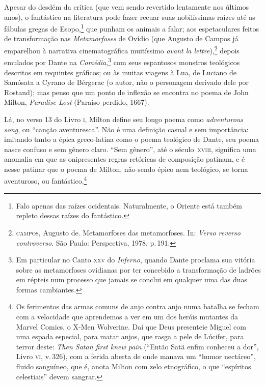 Apesar do desdém da crítica (que vem sendo revertido lentamente nos
últimos anos), o fantástico na literatura pode fazer recuar suas
nobilíssimas raízes até as fábulas gregas de Esopo,\footnote{Falo apenas
  das raízes ocidentais. Naturalmente, o Oriente está também repleto
  dessas raízes do fantástico.} que punham os animais a falar; aos
espetaculares feitos de transformação nas \emph{Metamorfoses} de Ovídio
(que Augusto de Campos já emparelhou à narrativa cinematográfica
muitíssimo \emph{avant la lettre}),\footnote{\textsc{campos}, Augusto de. Metamorfoses das
  metamorfoses. In: \emph{Verso reverso
  controverso}. São Paulo: Perspectiva, 1978, p.\,191.} depois emulados por
Dante na \emph{Comédia},\footnote{Em particular no Canto \textsc{xxv} do \emph{Inferno},
  quando Dante proclama sua vitória sobre as metamorfoses ovidianas por
  ter concebido a transformação de ladrões em répteis num processo que
  jamais se conclui em qualquer uma das duas formas cambiantes.} com
seus espantosos monstros teológicos descritos em requintes gráficos; ou
às muitas viagens à Lua, de Luciano de Samósata a Cyrano de Bérgerac (o
autor, não o personagem derivado dele por Rostand); mas penso que um
ponto de inflexão se encontra no poema de John Milton,
\emph{Paradise Lost} (Paraíso perdido, 1667).

Lá, no verso 13 do Livro \textsc{i}, Milton define seu longo poema como
\emph{adventurous song}, ou ``canção aventuresca''. Não é uma definição
casual e sem importância: imitando tanto a épica greco-latina como o
poema teológico de Dante, seu poema nasce confuso e sem gênero claro.
``Sem gênero'', até o século~\textsc{xviii}, significa uma anomalia em que as
onipresentes regras retóricas de composição patinam, e é nesse patinar
que o poema de Milton, não sendo épico nem teológico, se torna
aventuroso, ou fantástico.\footnote{Os ferimentos das armas comuns de
  anjo contra anjo numa batalha se fecham com a velocidade que
  aprendemos a ver em um dos heróis mutantes da Marvel Comics, o
  X-Men Wolverine. Daí que Deus presenteie Miguel com uma espada
  especial, para matar anjos, que rasga a pele de Lúcifer, para terror
  deste: \emph{Then Satan first knew pain} (``Então Satã enfim conheceu
  a dor'', Livro \textsc{vi}, v.\,326), com a ferida aberta de onde manava um
  ``humor nectáreo'', fluido sanguíneo, que é, anota Milton com zelo
  etnográfico, o que ``espíritos celestiais'' devem sangrar.}

